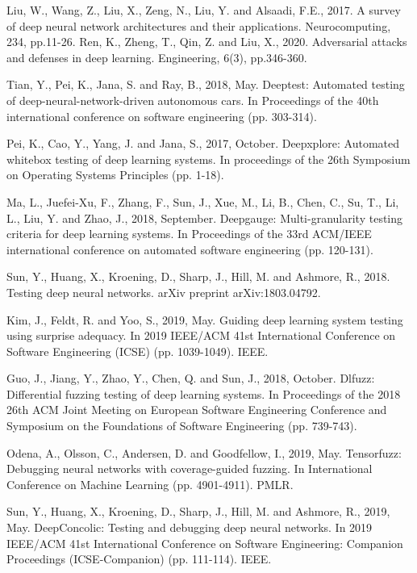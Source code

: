\documentclass[10pt, conference, a4paper, final]{IEEEtran}
\begin{document}
\begin{thebibliography}{01}

    Liu, W., Wang, Z., Liu, X., Zeng, N., Liu, Y. and Alsaadi, F.E., 2017. A survey of deep neural network architectures and their applications. Neurocomputing, 234, pp.11-26.
    Ren, K., Zheng, T., Qin, Z. and Liu, X., 2020. Adversarial attacks and defenses in deep learning. Engineering, 6(3), pp.346-360.

    Tian, Y., Pei, K., Jana, S. and Ray, B., 2018, May. Deeptest: Automated testing of deep-neural-network-driven autonomous cars. In Proceedings of the 40th international conference on software engineering (pp. 303-314).
    
     Pei, K., Cao, Y., Yang, J. and Jana, S., 2017, October. Deepxplore: Automated whitebox testing of deep learning systems. In proceedings of the 26th Symposium on Operating Systems Principles (pp. 1-18).

    Ma, L., Juefei-Xu, F., Zhang, F., Sun, J., Xue, M., Li, B., Chen, C., Su, T., Li, L., Liu, Y. and Zhao, J., 2018, September. Deepgauge: Multi-granularity testing criteria for deep learning systems. In Proceedings of the 33rd ACM/IEEE international conference on automated software engineering (pp. 120-131).
    
    Sun, Y., Huang, X., Kroening, D., Sharp, J., Hill, M. and Ashmore, R., 2018. Testing deep neural networks. arXiv preprint arXiv:1803.04792.

    Kim, J., Feldt, R. and Yoo, S., 2019, May. Guiding deep learning system testing using surprise adequacy. In 2019 IEEE/ACM 41st International Conference on Software Engineering (ICSE) (pp. 1039-1049). IEEE.
  
   
    Guo, J., Jiang, Y., Zhao, Y., Chen, Q. and Sun, J., 2018, October. Dlfuzz: Differential fuzzing testing of deep learning systems. In Proceedings of the 2018 26th ACM Joint Meeting on European Software Engineering Conference and Symposium on the Foundations of Software Engineering (pp. 739-743).

     Odena, A., Olsson, C., Andersen, D. and Goodfellow, I., 2019, May. Tensorfuzz: Debugging neural networks with coverage-guided fuzzing. In International Conference on Machine Learning (pp. 4901-4911). PMLR.

    Sun, Y., Huang, X., Kroening, D., Sharp, J., Hill, M. and Ashmore, R., 2019, May. DeepConcolic: Testing and debugging deep neural networks. In 2019 IEEE/ACM 41st International Conference on Software Engineering: Companion Proceedings (ICSE-Companion) (pp. 111-114). IEEE.

\end{thebibliography}
\end{document}

